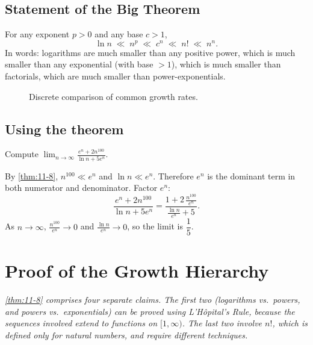 \subsection*{Statement of the Big Theorem}

\begin{theorem}
\label{thm:11-8}
For any exponent $p>0$ and any base $c>1$,
\[
  \ln n \;\ll\; n^{p} \;\ll\; c^{n} \;\ll\; n! \;\ll\; n^{n}.
\]
In words: logarithms are much smaller than any positive power, which is much smaller than any exponential (with base $>1$), which is much smaller than factorials, which are much smaller than power-exponentials.
\end{theorem}

\begin{figure}[ht]
  \centering
  
  \caption{Discrete comparison of common growth rates.}
  \label{fig:growth-hierarchy}
\end{figure}

\subsection*{Using the theorem}

\begin{example}
\label{ex:11-6}
Compute $\displaystyle\lim_{n\to\infty}\frac{e^{n}+2n^{100}}{\ln n+5e^{n}}$.

By \cref{thm:11-8}, $n^{100}\ll e^{n}$ and $\ln n\ll e^{n}$.  Therefore $e^{n}$ is the dominant term in both numerator and denominator.  Factor $e^{n}$:
\[
  \frac{e^{n}+2n^{100}}{\ln n+5e^{n}}
  =\frac{1+2\,\frac{n^{100}}{e^{n}}}{\frac{\ln n}{e^{n}}+5}.
\]
As $n\to\infty$, $\frac{n^{100}}{e^{n}}\to 0$ and $\frac{\ln n}{e^{n}}\to 0$, so the limit is $\dfrac{1}{5}$.
\end{example}

\section{Proof of the Growth Hierarchy}
\label{sec:11.8}

\textit{\cref{thm:11-8} comprises four separate claims.  The first two (logarithms vs.\ powers, and powers vs.\ exponentials) can be proved using L'H\^opital's Rule, because the sequences involved extend to functions on $[1,\infty)$.  The last two involve $n!$, which is defined only for natural numbers, and require different techniques.}

